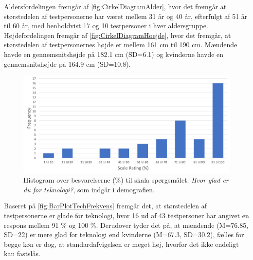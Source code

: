 \noindent
%
Aldersfordelingen fremgår af \autoref{fig:CirkelDiagramAlder}, hvor det fremgår at størstedelen af testpersonerne har været mellem 31 år og 40 år, efterfulgt af 51 år til 60 år, med henholdvist 17 og 10 testpersoner i hver aldersgruppe. Højdefordelingen fremgår af \autoref{fig:CirkelDiagramHoejde}, hvor det fremgår, at størstedelen af testpersonernes højde er mellem 161 cm til 190 cm. Mændende havde en gennemsnitshøjde på 182.1 cm (SD=6.1) og kvinderne havde en gennemsnitshøjde på 164.9 cm (SD=10.8). 
%
\begin{figure}[H]
\centering
\includegraphics[width = \textwidth]{Figure/DatabehandlingSkalaer/DataPresentation/HistogramTek} 
\caption{Histogram over besvarelserne (\%) til skala spørgsmålet: \textit{Hvor glad er du for teknologi?}, som indgår i demografien.}
\label{fig:HistogramTek}
\end{figure}
\noindent
%
Baseret på \autoref{fig:BarPlotTechFrekvens} fremgår det, at størstedelen af testpersonerne er glade for teknologi, hvor 16 ud af 43 testpersoner har angivet en respons mellem 91 \% og 100 \%. Derudover tyder det på, at mændende (M=76.85, SD=22) er mere glad for teknologi end kvinderne (M=67.3, SD=30.2), fælles for begge køn er dog, at standardafvigelsen er meget høj, hvorfor det ikke endeligt kan fastslås. 
